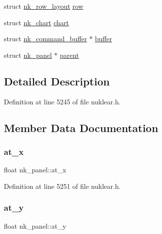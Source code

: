 \begin{DoxyCompactItemize}
\item 
struct \mbox{\hyperlink{structnk__row__layout}{nk\+\_\+row\+\_\+layout}} \mbox{\hyperlink{structnk__panel_a9687b3e8837edcf72a16332b80e6e42e}{row}}
\item 
struct \mbox{\hyperlink{structnk__chart}{nk\+\_\+chart}} \mbox{\hyperlink{structnk__panel_a435683be8b2ee51cf51eb8254bccbb87}{chart}}
\item 
struct \mbox{\hyperlink{structnk__command__buffer}{nk\+\_\+command\+\_\+buffer}} $\ast$ \mbox{\hyperlink{structnk__panel_af92431d2360f7f815e7caf2896ea9090}{buffer}}
\item 
struct \mbox{\hyperlink{structnk__panel}{nk\+\_\+panel}} $\ast$ \mbox{\hyperlink{structnk__panel_afce00b5b98ee2a0a8f274a5f626d798a}{parent}}
\end{DoxyCompactItemize}


\subsection{Detailed Description}


Definition at line 5245 of file nuklear.\+h.



\subsection{Member Data Documentation}
\mbox{\label{structnk__panel_a9479cf50da71987fe268685af6b59c54}} 
\subsubsection{\texorpdfstring{at\+\_\+x}{at\_x}}
{\footnotesize\ttfamily float nk\+\_\+panel\+::at\+\_\+x}



Definition at line 5251 of file nuklear.\+h.

\mbox{\label{structnk__panel_a35aa7e42a81f41b7b274b653c10bbc06}} 
\subsubsection{\texorpdfstring{at\+\_\+y}{at\_y}}
{\footnotesize\ttfamily float nk\+\_\+panel\+::at\+\_\+y}



